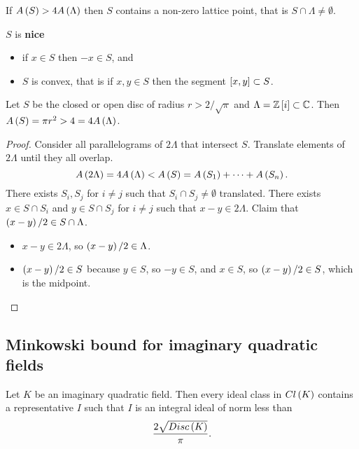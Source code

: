 \begin{theorem}
If $ A\br{S} > 4A\br{\Lambda} $ then $ S $ contains a non-zero lattice point, that is $ S \cap \Lambda \ne \emptyset $.
\end{theorem}

$ S $ is \textbf{nice}
\begin{itemize}
\item if $ x \in S $ then $ -x \in S $, and
\item $ S $ is convex, that is if $ x, y \in S $ then the segment $ \sbr{x, y} \subset S $.
\end{itemize}

\begin{example*}
Let $ S $ be the closed or open disc of radius $ r > 2 / \sqrt{\pi} $ and $ \Lambda = \Z\sbr{i} \subset \C $. Then $ A\br{S} = \pi r^2 > 4 = 4A\br{\Lambda} $.
\end{example*}

\begin{proof}
Consider all parallelograms of $ 2\Lambda $ that intersect $ S $. Translate elements of $ 2\Lambda $ until they all overlap.
$$ A\br{2\Lambda} = 4A\br{\Lambda} < A\br{S} = A\br{S_1} + \dots + A\br{S_n}. $$
There exists $ S_i, S_j $ for $ i \ne j $ such that $ S_i \cap S_j \ne \emptyset $ translated. There exists $ x \in S \cap S_i $ and $ y \in S \cap S_j $ for $ i \ne j $ such that $ x - y \in 2\Lambda $. Claim that $ \br{x - y} / 2 \in S \cap \Lambda $.
\begin{itemize}
\item $ x - y \in 2\Lambda $, so $ \br{x - y} / 2 \in \Lambda $.
\item $ \br{x - y} / 2 \in S $ because $ y \in S $, so $ -y \in S $, and $ x \in S $, so $ \br{x - y} / 2 \in S $, which is the midpoint.
\end{itemize}
\end{proof}

\pagebreak

\subsection{Minkowski bound for imaginary quadratic fields}

\begin{theorem}
Let $ K $ be an imaginary quadratic field. Then every ideal class in $ Cl\br{K} $ contains a representative $ I $ such that $ I $ is an integral ideal of norm less than
$$ \dfrac{2\sqrt{Disc\br{K}}}{\pi}. $$
\end{theorem}

